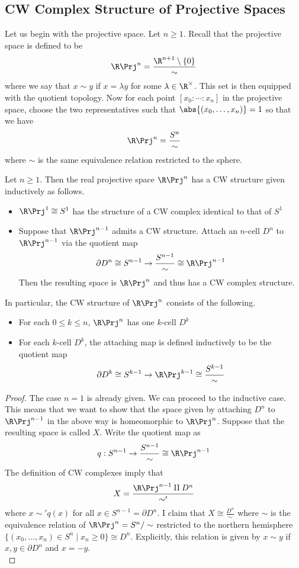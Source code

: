 \documentclass[a4paper]{article}
\begin{document}
\subsection{CW Complex Structure of Projective Spaces}
Let us begin with the projective space. Let $n\geq 1$. Recall that the projective space is defined to be $$\R\Prj^n=\frac{\R^{n+1}\setminus\{0\}}{\sim}$$ where we say that $x\sim y$ if $x=\lambda y$ for some $\lambda\in\R^\times$. This set is then equipped with the quotient topology. Now for each point $[x_0:\cdots:x_n]$ in the projective space, choose the two representatives such that $\abs{(x_0,\dots,x_n)}=1$ so that we have $$\R\Prj^n=\frac{S^n}{\sim}$$ where $\sim$ is the same equivalence relation restricted to the sphere. 

\begin{prp}{}{} Let $n\geq 1$. Then the real projective space $\R\Prj^n$ has a CW structure given inductively as follows. 
\begin{itemize}
\item $\R\Prj^1\cong S^1$ has the structure of a CW complex identical to that of $S^1$
\item Suppose that $\R\Prj^{n-1}$ admits a CW structure. Attach an $n$-cell $D^n$ to $\R\Prj^{n-1}$ via the quotient map $$\partial D^n\cong S^{n-1}\to\frac{S^{n-1}}{\sim}\cong\R\Prj^{n-1}$$ Then the resulting space is $\R\Prj^n$ and thus has a CW complex structure. 
\end{itemize}
In particular, the CW structure of $\R\Prj^n$ consists of the following. 
\begin{itemize}
\item For each $0\leq k\leq n$, $\R\Prj^n$ has one $k$-cell $D^k$
\item For each $k$-cell $D^k$, the attaching map is defined inductively to be the quotient map $$\partial D^k\cong S^{k-1}\to\R\Prj^{k-1}\cong\frac{S^{k-1}}{\sim}$$
\end{itemize} 
\begin{proof}
The case $n=1$ is already given. We can proceed to the inductive case. This means that we want to show that the space given by attaching $D^n$ to $\R\Prj^{n-1}$ in the above way is homeomorphic to $\R\Prj^n$. Suppose that the resulting space is called $X$. Write the quotient map as $$q:S^{n-1}\to\frac{S^{n-1}}{\sim}\cong\R\Prj^{n-1}$$ The definition of CW complexes imply that $$X=\frac{\R\Prj^{n-1}\amalg D^n}{\sim'}$$ where $x\sim' q(x)$ for all $x\in S^{n-1}=\partial D^n$. I claim that $X\cong\frac{D^n}{\sim}$ where $\sim$ is the equivalence relation of $\R\Prj^n=S^n/\sim$ restricted to the northern hemisphere $\{(x_0,\dots,x_n)\in S^n\;|\;x_n\geq 0\}\cong D^n$. Explicitly, this relation is given by $x\sim y$ if $x,y\in\partial D^n$ and $x=-y$. \\

\end{proof}
\end{prp}
\end{document}
